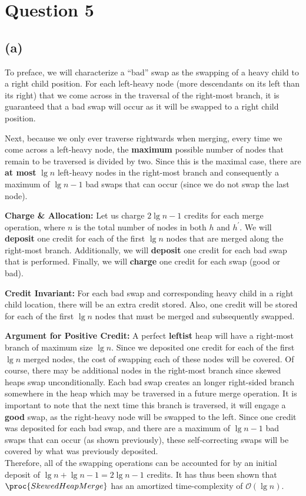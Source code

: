 \section{Question 5}
\subsection{(a)}

To preface, we will characterize a ``bad'' swap as the swapping of a heavy child to a right child position.
For each left-heavy node (more descendants on its left than its right) that we come across in
the traversal of the right-most branch, it is guaranteed that a bad swap will occur as it will be swapped to a right child position.\vspace{3mm}

Next, because we only ever traverse rightwards when merging, every time we come across a left-heavy node, the \textbf{maximum} possible number
of nodes that remain to be traversed is divided by two.
Since this is the maximal case, there are \textbf{at most} $\lg{n}$ left-heavy nodes in the right-most branch and consequently a maximum of $\lg{n} - 1$ bad swaps that can occur (since we do not swap the last node).\vspace{3mm}

\textbf{Charge \& Allocation:} Let us charge $2\lg{n} - 1$ credits for each merge operation, where $n$ is the total number of nodes in both $h$ and $h^\prime$.
We will \textbf{deposit} one credit for each of the first $\lg{n}$ nodes that are merged along the right-most branch.
Additionally, we will \textbf{deposit} one credit for each bad swap that is performed.
Finally, we will \textbf{charge} one credit for each swap (good or bad).

\textbf{Credit Invariant:} For each bad swap and corresponding heavy child in a right child location,
there will be an extra credit stored. Also, one credit will be stored for each of the first $\lg{n}$ nodes that must be merged and subsequently swapped.

\textbf{Argument for Positive Credit:}
A perfect \textbf{leftist} heap will have a right-most branch of maximum size $\lg{n}$.
Since we deposited one credit for each of the first $\lg{n}$ merged nodes,
the cost of swapping each of these nodes will be covered.
Of course, there may be additional nodes in the right-most branch since skewed heaps swap unconditionally.
Each bad swap creates an longer right-sided branch somewhere in the heap which may be traversed in a future merge operation.
It is important to note that the next time this branch is traversed, it will engage a \textbf{good} swap, as the right-heavy node will be swapped to the left.
Since one credit was deposited for each bad swap, and there are a maximum of $\lg{n} - 1$ bad swaps that can occur (as shown previously),
these self-correcting swaps will be covered by what was previously deposited.\\
Therefore, all of the swapping operations can be accounted
for by an initial deposit of $\lg{n} + \lg{n} - 1 = 2\lg{n} - 1$ credits.
It has thus been shown that $\proc{SkewedHeapMerge}$ has an amortized time-complexity of $\mathcal{O}(\lg{n})$.

